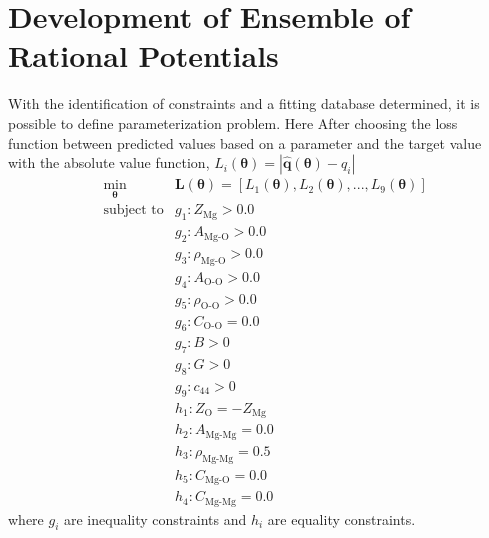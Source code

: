 \section{Development of Ensemble of Rational Potentials}

With the identification of constraints and a fitting database determined, it is possible to define parameterization problem.  Here After choosing the loss function between predicted values based on a parameter and the target value with the absolute value function, $L_i(\bm{\theta})=|\hat{\bm{q}}(\bm{\theta})-q_i|$
\begin{align}
	&\min_{\bm{\theta}} &\bm{L}(\bm{\theta})=[
	    L_1(\bm{\theta}),
			L_2(\bm{\theta}),
			...,
			L_9(\bm{\theta})] \\
	&\text{subject to} &g_1: Z_{\text{Mg}} > 0.0 \\
	& &g_2: A_{\text{Mg-O}} > 0.0 \\
	& &g_3: \rho_{\text{Mg-O}} > 0.0 \\
	& &g_4: A_{\text{O-O}} > 0.0 \\
	& &g_5: \rho_{\text{O-O}} > 0.0 \\
	& &g_6: C_{\text{O-O}} = 0.0 \\
	& &g_7: B > 0 \\
	& &g_8: G > 0 \\
	& &g_9: c_{44} > 0 \\
  & &h_1: Z_{\text{O}} = -Z_{\text{Mg}} \\
  & &h_2: A_{\text{Mg-Mg}} = 0.0 \\
  & &h_3: \rho_{\text{Mg-Mg}} = 0.5 \\
	& &h_5: C_{\text{Mg-O}} = 0.0 \\
  & &h_4: C_{\text{Mg-Mg}} = 0.0
\end{align}
where $g_i$ are inequality constraints and $h_i$ are equality constraints.

